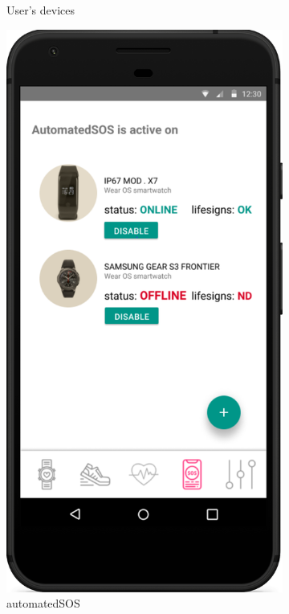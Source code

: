 \documentclass[../main.tex]{subfiles}
\begin{document}
\begin{figure}[H]
\begin{subfigure}[b]{0.45\linewidth}
		\caption{User's devices}
		\label{mock_userDevices}
	\end{subfigure}
	\begin{subfigure}[b]{0.45\linewidth}
		\includegraphics[width=\linewidth]{images/mockup/AutomatedSOS2.png}
		\caption{automatedSOS}
		\label{mock_automatedSOS}
	\end{subfigure}
	\caption{}
\end{figure}
\end{document}
